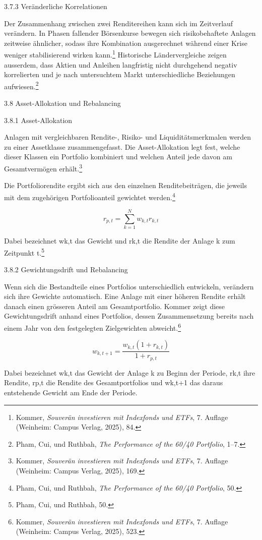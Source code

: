 \documentclass[
  ngerman,
  a4paper,
  DIV=11,
  oneside]{scrreprt}
\begin{document}
3.7.3 Veränderliche Korrelationen

Der Zusammenhang zwischen zwei Renditereihen kann sich im Zeitverlauf
verändern. In Phasen fallender Börsenkurse bewegen sich risikobehaftete
Anlagen zeitweise ähnlicher, sodass ihre Kombination ausgerechnet
während einer Krise weniger stabilisierend wirken kann.\footnote{Kommer,
  \emph{Souverän investieren mit Indexfonds und ETFs}, 7. Auflage
  (Weinheim: Campus Verlag, 2025), 84.} Historische Ländervergleiche
zeigen ausserdem, dass Aktien und Anleihen langfristig nicht durchgehend
negativ korrelierten und je nach untersuchtem Markt unterschiedliche
Beziehungen aufwiesen.\footnote{Pham, Cui, und Ruthbah, \emph{The
  {Performance} of the 60/40 {Portfolio}}, 1--7.}

3.8 Asset-Allokation und Rebalancing

3.8.1 Asset-Allokation

Anlagen mit vergleichbaren Rendite-, Risiko- und Liquiditätsmerkmalen
werden zu einer Assetklasse zusammengefasst. Die Asset-Allokation legt
fest, welche dieser Klassen ein Portfolio kombiniert und welchen Anteil
jede davon am Gesamtvermögen erhält.\footnote{Kommer, \emph{Souverän
  investieren mit Indexfonds und ETFs}, 7. Auflage (Weinheim: Campus
  Verlag, 2025), 169.}

Die Portfoliorendite ergibt sich aus den einzelnen Renditebeiträgen, die
jeweils mit dem zugehörigen Portfolioanteil gewichtet werden.\footnote{Pham,
  Cui, und Ruthbah, \emph{The {Performance} of the 60/40 {Portfolio}},
  50.}

\[
r_{p,t}=\sum_{k=1}^{N}w_{k,t}r_{k,t}
\]

Dabei bezeichnet wk,t das Gewicht und rk,t die Rendite der Anlage k zum
Zeitpunkt t.\footnote{Pham, Cui, und Ruthbah, 50.}

3.8.2 Gewichtungsdrift und Rebalancing

Wenn sich die Bestandteile eines Portfolios unterschiedlich entwickeln,
verändern sich ihre Gewichte automatisch. Eine Anlage mit einer höheren
Rendite erhält danach einen grösseren Anteil am Gesamtportfolio. Kommer
zeigt diese Gewichtungsdrift anhand eines Portfolios, dessen
Zusammensetzung bereits nach einem Jahr von den festgelegten
Zielgewichten abweicht.\footnote{Kommer, \emph{Souverän investieren mit
  Indexfonds und ETFs}, 7. Auflage (Weinheim: Campus Verlag, 2025), 523.}

\[
w_{k,t+1}=\frac{w_{k,t}(1+r_{k,t})}{1+r_{p,t}}
\]

Dabei bezeichnet wk,t das Gewicht der Anlage k zu Beginn der Periode,
rk,t ihre Rendite, rp,t die Rendite des Gesamtportfolios und wk,t+1 das
daraus entstehende Gewicht am Ende der Periode.
\end{document}
